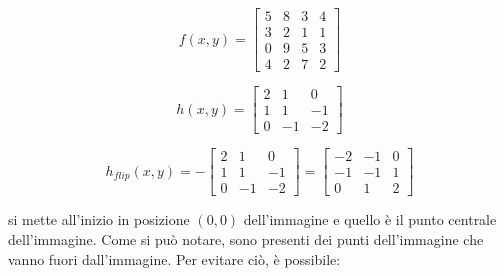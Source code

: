 \begin{center}
\begin{minipage}{0.14\textwidth} %
    \centering
    \begin{equation*}
        f(x,y) = \begin{bmatrix}
            5 & 8 & 3 & 4 \\
            3 & 2 & 1 & 1 \\
            0 & 9 & 5 & 3 \\
            4 & 2 & 7 & 2
        \end{bmatrix}
    \end{equation*}
\end{minipage}
\hfill %
\begin{minipage}{0.14\textwidth} %
    \centering
    \begin{equation*}
    h(x,y) = \begin{bmatrix}
            2 & 1 & 0 \\
            1 & 1 & -1 \\
            0 & -1 & -2
        \end{bmatrix}
    \end{equation*}
\end{minipage}
\hfill %
\begin{minipage}{0.45\textwidth} %
    \centering
    \begin{equation*}
    h_{flip}(x,y) = -\begin{bmatrix}
            2 & 1 & 0 \\
            1 & 1 & -1 \\
            0 & -1 & -2
        \end{bmatrix}=
        \begin{bmatrix}
            -2 & -1 & 0 \\
            -1 & -1 & 1 \\
            0 & 1 & 2
         \end{bmatrix}   
    \end{equation*}
\end{minipage}
\end{center}
si mette all'inizio in posizione $(0,0)$ dell'immagine e quello è il punto centrale dell'immagine. Come si può notare, sono presenti dei punti dell'immagine che vanno fuori dall'immagine. Per evitare ciò, è possibile:
